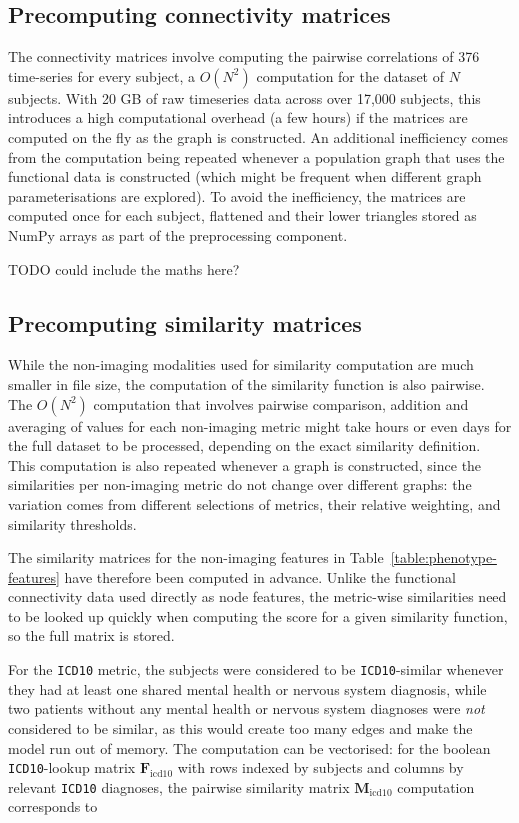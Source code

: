 \subsection{Precomputing connectivity matrices}
The connectivity matrices involve computing the pairwise correlations of 376 time-series for every subject, a $O(N^2)$ computation for the dataset of  $N$ subjects. With 20 GB of raw timeseries data across over 17,000 subjects, this introduces a high computational overhead (a few hours) if the matrices are computed on the fly as the graph is constructed. An additional inefficiency comes from the computation being repeated whenever a population graph that uses the functional data is constructed (which might be frequent when different graph parameterisations are explored). To avoid the inefficiency, the matrices are computed once for each subject, flattened and their lower triangles stored as NumPy arrays as part of the preprocessing component.

TODO could include the maths here?

\subsection{Precomputing similarity matrices}
While the non-imaging modalities used for similarity computation are much smaller in file size, the computation of the similarity function is also pairwise. The $O(N^2)$ computation that involves pairwise comparison, addition and averaging of values for each non-imaging metric might take hours or even days for the full dataset to be processed, depending on the exact similarity definition. This computation is also repeated whenever a graph is constructed, since the similarities per non-imaging metric do not change over different graphs: the variation comes from different selections of metrics, their relative weighting, and similarity thresholds.

The similarity matrices for the non-imaging features in Table~\ref{table:phenotype-features} have therefore been computed in advance. Unlike the functional connectivity data used directly as node features, the metric-wise similarities need to be looked up quickly when computing the score for a given similarity function, so the full matrix is stored.


For the \texttt{ICD10} metric, the subjects were considered to be \texttt{ICD10}-similar whenever they had at least one shared mental health or nervous system diagnosis, while two patients without any mental health or nervous system diagnoses were \textit{not} considered to be similar, as this would create too many edges and make the model run out of memory. The computation can be vectorised: for the boolean \texttt{ICD10}-lookup matrix $\mathbf{F}_{\text{icd10}}$ with rows indexed by subjects and columns by relevant \texttt{ICD10} diagnoses, the pairwise similarity matrix $\mathbf{M}_{\text{icd10}}$ computation corresponds to 

